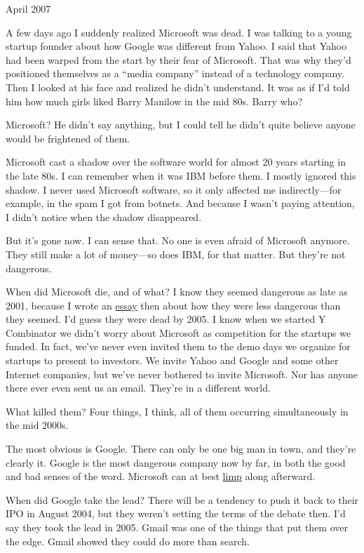 April 2007

A few days ago I suddenly realized Microsoft was dead. I was talking to
a young startup founder about how Google was different from Yahoo. I
said that Yahoo had been warped from the start by their fear of
Microsoft. That was why they'd positioned themselves as a ``media
company'' instead of a technology company. Then I looked at his face and
realized he didn't understand. It was as if I'd told him how much girls
liked Barry Manilow in the mid 80s. Barry who?

Microsoft? He didn't say anything, but I could tell he didn't quite
believe anyone would be frightened of them.

Microsoft cast a shadow over the software world for almost 20 years
starting in the late 80s. I can remember when it was IBM before them. I
mostly ignored this shadow. I never used Microsoft software, so it only
affected me indirectly---for example, in the spam I got from botnets.
And because I wasn't paying attention, I didn't notice when the shadow
disappeared.

But it's gone now. I can sense that. No one is even afraid of Microsoft
anymore. They still make a lot of money---so does IBM, for that matter.
But they're not dangerous.

When did Microsoft die, and of what? I know they seemed dangerous as
late as 2001, because I wrote an \href{road.html}{essay} then about how
they were less dangerous than they seemed. I'd guess they were dead by
2005. I know when we started Y Combinator we didn't worry about
Microsoft as competition for the startups we funded. In fact, we've
never even invited them to the demo days we organize for startups to
present to investors. We invite Yahoo and Google and some other Internet
companies, but we've never bothered to invite Microsoft. Nor has anyone
there ever even sent us an email. They're in a different world.

What killed them? Four things, I think, all of them occurring
simultaneously in the mid 2000s.

The most obvious is Google. There can only be one big man in town, and
they're clearly it. Google is the most dangerous company now by far, in
both the good and bad senses of the word. Microsoft can at best
\href{http://live.com}{limp} along afterward.

When did Google take the lead? There will be a tendency to push it back
to their IPO in August 2004, but they weren't setting the terms of the
debate then. I'd say they took the lead in 2005. Gmail was one of the
things that put them over the edge. Gmail showed they could do more than
search.

